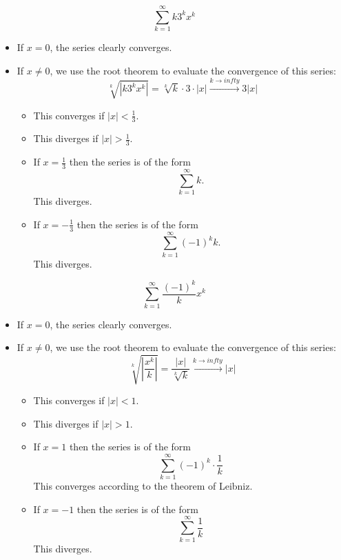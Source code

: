 \documentclass[week=12]{homework}
\begin{document}
\begin{questions}
	     \[
	     \sum_{k=1}^{\infty} k 3^k x^k  
	     \]
	     \begin{itemize}
	     	\item If $x = 0$, the series clearly converges. 
	     	\item If $x \not = 0$, we use the root theorem to evaluate the convergence of this series:
	     	\[
	     	\sqrt[k]{|k 3^k x^k |} = \sqrt[k]{k} \cdot 3 \cdot |x| \xrightarrow{k \to infty} 3|x|
	     	\]
	     	\begin{itemize}
	     		\item This converges if $|x| < \frac{1}{3}$.
	     		\item This diverges if $|x| > \frac{1}{3}$.
	     		\item If $x = \frac{1}{3}$ then the series is of the form 
	     		\[
	     		\sum_{k=1}^{\infty} k.
	     		\]
	     		This diverges. 
	     		\item If $x = -\frac{1}{3}$ then the series is of the form 
	     		\[
	     		\sum_{k=1}^{\infty} (-1)^k k.
	     		\]
	     		This diverges. 
	     	\end{itemize}
	     \end{itemize}
	     
	     \[
	     \sum_{k=1}^{\infty} \frac{(-1)^k}{k} x^k 
	     \]
	     \begin{itemize}
	     	\item If $x = 0$, the series clearly converges. 
	     	\item If $x \not = 0$, we use the root theorem to evaluate the convergence of this series:
	     	\[
	     	\sqrt[k]{\left| \frac{x^k}{k} \right|} = \frac{|x|}{\sqrt[k]{k}}\xrightarrow{k \to infty} |x|
	     	\]
	     	\begin{itemize}
	     		\item This converges if $|x| < 1$.
	     		\item This diverges if $|x| > 1$.
	     		\item If $x = 1$ then the series is of the form 
	     		\[
	     		\sum_{k=1}^{\infty} (-1)^k \cdot \frac{1}{k}
	     		\]
	     		This converges according to the theorem of Leibniz.
	     		\item If $x = -1$ then the series is of the form 
	     		\[
	     		\sum_{k=1}^{\infty} \frac{1}{k}
	     		\]
	     		This diverges. 
	     	\end{itemize}
	     \end{itemize}
     \end{questions}
\end{document}
